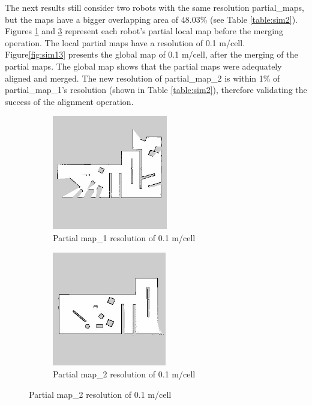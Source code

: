 The next results still consider two robots with the same resolution partial\_maps, but the maps have a bigger overlapping area of 48.03\% (see Table \ref{table:sim2}). Figures \ref{fig:sim21} and \ref{fig:sim22} represent each robot's partial local map before the merging operation. The local partial maps have a resolution of 0.1 m/cell. Figure\ref{fig:sim13} presents the global map of 0.1 m/cell, after the merging of the partial maps. The global map shows that the partial maps were adequately aligned and merged. The new resolution of partial\_map\_2 is within 1\% of partial\_map\_1's resolution (shown in Table \ref{table:sim2}), therefore validating the success of the alignment operation.  

\begin{figure}[H]
\begin{subfigure}{0.5\textwidth}
\includegraphics[width=0.9\linewidth, height=5cm]{figs/simulation_results/b/partial_map_1.jpg} 
\caption{Partial map\_1 resolution of 0.1 m/cell}
\label{fig:sim21}
\end{subfigure}
\begin{subfigure}{0.5\textwidth}
\includegraphics[width=0.9\linewidth, height=5cm]{figs/simulation_results/b/partial_map_2.jpg} 
\caption{Partial map\_2 resolution of 0.1 m/cell}
\label{fig:sim22}
\end{subfigure}

\end{figure}
